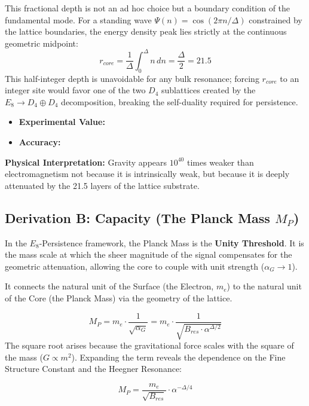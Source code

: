 This fractional depth is not an ad hoc choice but a boundary condition of the fundamental mode. For a standing wave $\Psi(n) = \cos(2\pi n / \Delta)$ constrained by the lattice boundaries, the energy density peak lies strictly at the continuous geometric midpoint:
\begin{equation}
r_{core} = \frac{1}{\Delta} \int_0^\Delta n \, dn = \frac{\Delta}{2} = 21.5
\end{equation}
 This half-integer depth is unavoidable for any bulk resonance; forcing $r_{core}$ to an integer site would favor one of the two $D_4$ sublattices created by the $E_8 \to D_4 \oplus D_4$ decomposition, breaking the self-duality required for persistence.

\begin{itemize}
    \item \textbf{Experimental Value:} \GravCouplingExperimentalValue
    \item \textbf{Accuracy:} \GravCouplingAccText
\end{itemize}

\textbf{Physical Interpretation:} Gravity appears $10^{40}$ times weaker than electromagnetism not because it is intrinsically weak, but because it is deeply attenuated by the 21.5 layers of the lattice substrate.

\subsection{Derivation B: Capacity (The Planck Mass \texorpdfstring{$M_P$}{MP})}
In the $E_8$-Persistence framework, the Planck Mass is the \textbf{Unity Threshold}. It is the mass scale at which the sheer magnitude of the signal compensates for the geometric attenuation, allowing the core to couple with unit strength ($\alpha_G \to 1$).

It connects the natural unit of the Surface (the Electron, $m_e$) to the natural unit of the Core (the Planck Mass) via the geometry of the lattice.

\begin{equation}
M_P = m_e \cdot \frac{1}{\sqrt{\alpha_G}} = m_e \cdot \frac{1}{\sqrt{B_{res} \cdot \alpha^{\Delta/2}}}
\end{equation}
The square root arises because the gravitational force scales with the square of the mass ($G \propto m^2$). Expanding the term reveals the dependence on the Fine Structure Constant and the Heegner Resonance:

\begin{equation}
M_P = \frac{m_e}{\sqrt{B_{res}}} \cdot \alpha^{-\Delta/4}
\end{equation}

